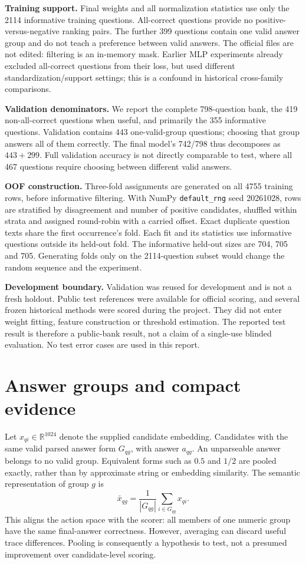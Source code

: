 \documentclass[11pt,a4paper]{article}
\newcommand{\code}[1]{\texttt{\small #1}}
\newcommand{\R}{\mathbb{R}}
\newcommand{\pageheading}[1]{\section{#1}}
\begin{document}
\textbf{Training support.} Final weights and all normalization statistics use
only the 2114 informative training questions. All-correct questions provide no
positive-versus-negative ranking pairs. The further 399 questions contain one
valid answer group and do not teach a preference between valid answers. The
official files are not edited: filtering is an in-memory mask. Earlier MLP
experiments already excluded all-correct questions from their loss, but used
different standardization/support settings; this is a confound in historical
cross-family comparisons.

\textbf{Validation denominators.} We report the complete 798-question bank, the
419 non-all-correct questions when useful, and primarily the 355 informative
questions. Validation contains 443 one-valid-group questions; choosing that group
answers all of them correctly. The final model's 742/798 thus decomposes as
$443+299$. Full validation accuracy is not directly comparable to test, where
all 467 questions require choosing between different valid answers.

\textbf{OOF construction.} Three-fold assignments are generated on all 4755
training rows, before informative filtering. With NumPy \code{default\_rng}
seed 20261028, rows are stratified by disagreement and number of positive
candidates, shuffled within strata and assigned round-robin with a carried
offset. Exact duplicate question texts share the first occurrence's fold. Each
fit and its statistics use informative questions outside its held-out fold.
The informative held-out sizes are 704, 705 and 705. Generating folds only on
the 2114-question subset would change the random sequence and the experiment.

\textbf{Development boundary.} Validation was reused for development and is
not a fresh holdout. Public test references were available for official scoring,
and several frozen historical methods were scored during the project. They did
not enter weight fitting, feature construction or threshold estimation. The
reported test result is therefore a public-bank result, not a claim of a
single-use blinded evaluation. No test error cases are used in this report.

\newpage
\pageheading{Answer groups and compact evidence}
Let $x_{qi}\in\R^{1024}$ denote the supplied candidate embedding. Candidates with
the same valid parsed answer form $G_{qg}$, with answer $a_{qg}$. An unparseable
answer belongs to no valid group. Equivalent forms such as $0.5$ and $1/2$
are pooled exactly, rather than by approximate string or embedding similarity.
The semantic representation of group $g$ is
\[
\bar x_{qg}=\frac{1}{|G_{qg}|}\sum_{i\in G_{qg}}x_{qi}.
\]
This aligns the action space with the scorer: all members of one numeric group
have the same final-answer correctness. However, averaging can discard useful
trace differences. Pooling is consequently a hypothesis to test, not a presumed
improvement over candidate-level scoring.
\end{document}
